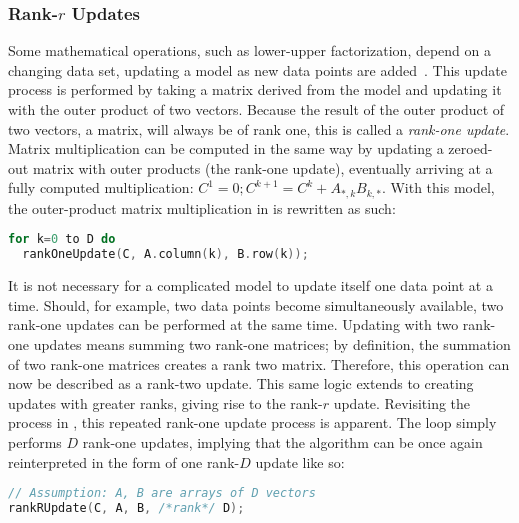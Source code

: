 \documentclass[\main/thesis.tex]{subfiles}
\begin{document}
\subsubsection{Rank-\texorpdfstring{$r$}{r} Updates}
Some mathematical operations, such as lower-upper factorization, depend on a changing data set, updating a model as new data points are added~\autocite{strange2007efficient}.
This update process is performed by taking a matrix derived from the model and updating it with the outer product of two vectors.
Because the result of the outer product of two vectors, a matrix, will always be of rank one, this is called a \emph{rank-one update}.\footnotemark
{}
Matrix multiplication can be computed in the same way by updating a zeroed-out matrix with outer products (the rank-one update), eventually arriving at a fully computed multiplication: $C^1=0; C^{k+1}=C^k+A_{*,k}B_{k,*}$.
With this model, the outer-product matrix multiplication in  is rewritten as such:
\begin{lstlisting}[caption={[Matrix multiplication via rank-one update]Matrix multiplication using rank-one update.},label=lst:rankOne,language=C++,columns=flexible,morekeywords=uint64_t]
for k=0 to D do
  rankOneUpdate(C, A.column(k), B.row(k));
\end{lstlisting}

It is not necessary for a complicated model to update itself one data point at a time.
Should, for example, two data points become simultaneously available, two rank-one updates can be performed at the same time.
Updating with two rank-one updates means summing two rank-one matrices; by definition, the summation of two rank-one matrices creates a rank two matrix.\footnotemark
{}
Therefore, this operation can now be described as a rank-two update.
This same logic extends to creating updates with greater ranks, giving rise to the rank-$r$ update.\footnotemark
{}
Revisiting the process in , this repeated rank-one update process is apparent.
The loop simply performs $D$ rank-one updates, implying that the algorithm can be once again reinterpreted in the form of one rank-$D$ update like so:
\begin{lstlisting}[caption={[Matrix multiplication via rank-$r$ update]Matrix multiplication using rank-$r$ update.},label=lst:rankR,language=C++,columns=flexible,morekeywords=uint64_t]
// Assumption: A, B are arrays of D vectors
rankRUpdate(C, A, B, /*rank*/ D);
\end{lstlisting}
\end{document}
